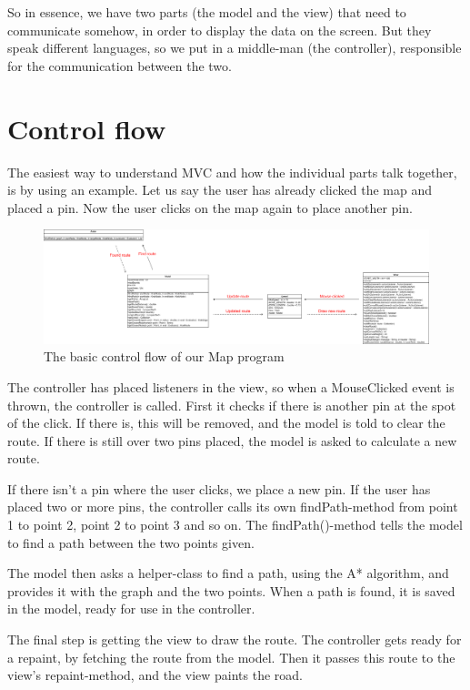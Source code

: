 So in essence, we have two parts (the model and the view) that need to communicate 
somehow, in order to display the data on the screen. But they speak different languages, so 
we put in a middle-man (the controller), responsible for the communication between the two.

\section{Control flow}
\label{UML-CF}
The easiest way to understand MVC and how the individual parts talk together, is by using 
an example. Let us say the user has already clicked the map and placed a pin. Now the 
user clicks on the map again to place another pin.

\begin{figure}[h!]
\centering
\includegraphics[angle=90,width=0.5\linewidth]{images/control-flow}
\caption{The basic control flow of our Map program}
\label{control-flow}
\end{figure}

The controller has placed listeners in the view, so when a MouseClicked event is thrown, 
the controller is called. First it checks if there is another pin at the spot of the click. If there 
is, this will be removed, and the model is told to clear the route. If there is still over two 
pins placed, the model is asked to calculate a new route.

If there isn't a pin where the user clicks, we place a new pin. If the user has placed two or 
more pins, the controller calls its own findPath-method from point 1 to point 2, point 2 to 
point 3 and so on. The findPath()-method tells the model to find a path between the two 
points given.

The model then asks a helper-class to find a path, using the A* algorithm, and provides it 
with the graph and the two points. When a path is found, it is saved in the model, ready 
for use in the controller.

The final step is getting the view to draw the route. The controller gets ready for a repaint, 
by fetching the route from the model. Then it passes this route to the view's repaint-method, 
and the view paints the road.